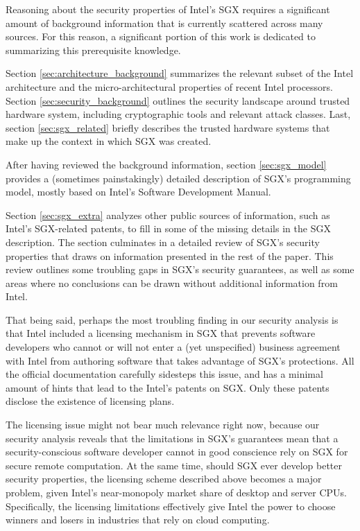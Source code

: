 \label{sec:sgx_intro_outline}

Reasoning about the security properties of Intel's SGX requires a significant
amount of background information that is currently scattered across many
sources. For this reason, a significant portion of this work is dedicated to
summarizing this prerequisite knowledge.

Section \ref{sec:architecture_background} summarizes the relevant subset of the
Intel architecture and the micro-architectural properties of recent Intel
processors. Section \ref{sec:security_background} outlines the security
landscape around trusted hardware system, including cryptographic tools and
relevant attack classes. Last, section \ref{sec:sgx_related} briefly describes
the trusted hardware systems that make up the context in which SGX was created.

After having reviewed the background information, section \ref{sec:sgx_model}
provides a (sometimes painstakingly) detailed description of SGX's programming
model, mostly based on Intel's Software Development Manual.

Section \ref{sec:sgx_extra} analyzes other public sources of information, such
as Intel's SGX-related patents, to fill in some of the missing details in the
SGX description. The section culminates in a detailed review of SGX's security
properties that draws on information presented in the rest of the paper. This
review outlines some troubling gaps in SGX's security guarantees, as well as
some areas where no conclusions can be drawn without additional information
from Intel.

That being said, perhaps the most troubling finding in our security analysis is
that Intel included a licensing mechanism in SGX that prevents software
developers who cannot or will not enter a (yet unspecified) business agreement
with Intel from authoring software that takes advantage of SGX's protections.
All the official documentation carefully sidesteps this issue, and has a
minimal amount of hints that lead to the Intel's patents on SGX. Only these
patents disclose the existence of licensing plans.

The licensing issue might not bear much relevance right now, because our
security analysis reveals that the limitations in SGX's guarantees mean that a
security-conscious software developer cannot in good conscience rely on SGX for
secure remote computation. At the same time, should SGX ever develop better
security properties, the licensing scheme described above becomes a major
problem, given Intel's near-monopoly market share of desktop and server CPUs.
Specifically, the licensing limitations effectively give Intel the power to
choose winners and losers in industries that rely on cloud computing.
